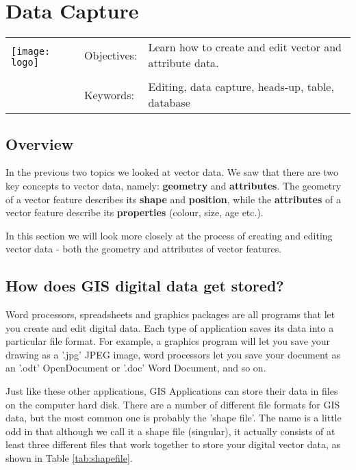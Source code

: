 

\section{Data Capture}\label{sec:datacapture}
\begin{tabular}{p{3.5cm}p{6cm}p{6cm}}
\multirow{2}{*}{\texttt{[image: logo]}} & Objectives: &
Learn how to create and edit vector and attribute data. \\
& & \\
& Keywords: & 
Editing, data capture, heads-up, table, database  \\
\hline
\end{tabular}

\subsection{Overview}\label{subsec:overview}

In the previous two topics we looked at vector data. We saw that there are
two key concepts to vector data, namely: \textbf{geometry} and
\textbf{attributes}. The
geometry of a vector feature describes its \textbf{shape} and
\textbf{position}, while the
\textbf{attributes} of a vector feature describe its \textbf{properties}
(colour, size, age etc.).

In this section we will look more closely at the process of creating and
editing vector data - both the geometry and attributes of vector features.

\subsection{How does GIS digital data get stored?}

Word processors, spreadsheets and graphics packages are all programs that let
you create and edit digital data. Each type of application saves its data
into a particular file format. For example, a graphics program will let you
save your drawing as a '.jpg' JPEG image, word processors let you save your
document as an '.odt' OpenDocument or '.doc' Word Document, and so on.

Just like these other applications, GIS Applications can store their data in
files on the computer hard disk. There are a number of different file formats
for GIS data, but the most common one is probably the 'shape file'. The name
is a little odd in that although we call it a shape file (singular), it
actually consists of at least three different files that work together to
store your digital vector data, as shown in Table \ref{tab:shapefile}. 

